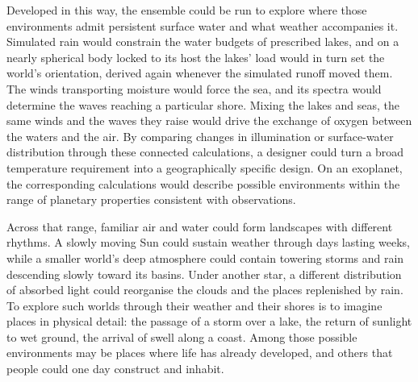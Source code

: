 Developed in this way, the ensemble could be run to explore where those environments admit persistent
surface water and what weather accompanies it. Simulated rain would constrain the water budgets of
prescribed lakes, and on a nearly spherical body locked to its host the lakes' load would in turn set the world's
orientation, derived again whenever the simulated runoff moved them. The winds transporting moisture would force the
sea, and its spectra would determine the waves reaching a particular shore. Mixing the lakes and seas, the same winds and the waves they raise would
drive the exchange of oxygen between the waters and the air. By comparing changes in illumination or surface-water distribution through these connected calculations, a designer could turn a broad temperature requirement into a geographically
specific design. On an exoplanet, the corresponding calculations would describe possible environments
within the range of planetary properties consistent with observations.

Across that range, familiar air and water could form landscapes with different rhythms. A slowly
moving Sun could sustain weather through days lasting weeks, while a smaller world's deep atmosphere
could contain towering storms and rain descending slowly toward its basins. Under another star, a
different distribution of absorbed light could reorganise the clouds and the places replenished by
rain. To explore such worlds through their weather and their shores is to imagine places in physical
detail: the passage of a storm over a lake, the return of sunlight to wet ground, the arrival of swell
along a coast. Among those possible environments may be places where life has already developed, and
others that people could one day construct and inhabit.
